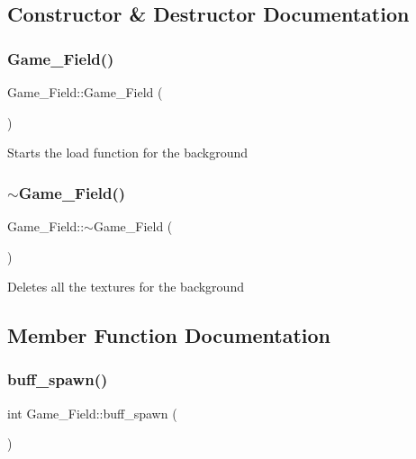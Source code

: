 \subsection{Constructor \& Destructor Documentation}
\mbox{\label{classGame__Field_aa62311d75d2c83c069535ca310b7585d}} 
\subsubsection{\texorpdfstring{Game\+\_\+\+Field()}{Game\_Field()}}
{\footnotesize\ttfamily Game\+\_\+\+Field\+::\+Game\+\_\+\+Field (\begin{DoxyParamCaption}{ }\end{DoxyParamCaption})}

Starts the load function for the background \mbox{\label{classGame__Field_a1cc20d15758ae0d3e31492448bc4d47f}} 
\subsubsection{\texorpdfstring{$\sim$\+Game\+\_\+\+Field()}{~Game\_Field()}}
{\footnotesize\ttfamily Game\+\_\+\+Field\+::$\sim$\+Game\+\_\+\+Field (\begin{DoxyParamCaption}{ }\end{DoxyParamCaption})}

Deletes all the textures for the background 

\subsection{Member Function Documentation}
\mbox{\label{classGame__Field_a8f7d0feefd13f9ba229e08d4e270528d}} 
\subsubsection{\texorpdfstring{buff\+\_\+spawn()}{buff\_spawn()}}
{\footnotesize\ttfamily int Game\+\_\+\+Field\+::buff\+\_\+spawn (\begin{DoxyParamCaption}{ }\end{DoxyParamCaption})}


